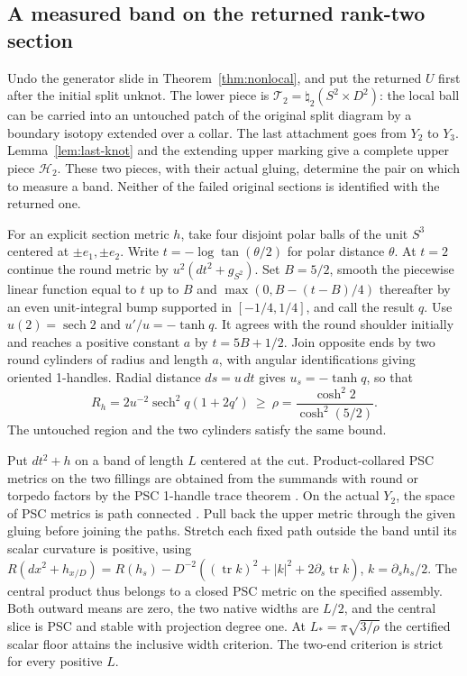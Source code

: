 \documentclass[11pt,letterpaper]{article}
\numberwithin{equation}{section}
\theoremstyle{remark}
\newcommand{\HB}[1]{\mathcal H_{#1}}
\newcommand{\TB}[1]{\mathcal T_{#1}}
\DeclareMathOperator{\tr}{tr}
\begin{document}
\subsection{A measured band on the returned rank-two section}

Undo the generator slide in Theorem~\ref{thm:nonlocal}, and put
the returned \(U\) first after the initial split unknot. The lower
piece is \(\TB2=\natural_2(S^2\times D^2)\): the local ball can
be carried into an untouched patch of the original split diagram
by a boundary isotopy extended over a collar. The last attachment
goes from \(Y_2\) to \(Y_3\). Lemma~\ref{lem:last-knot} and the
extending upper marking give a complete upper piece \(\HB2\).
These two pieces, with their actual gluing, determine the pair on
which to measure a band. Neither of the failed original sections is
identified with the returned one.

For an explicit section metric \(h\), take four disjoint polar
balls of the unit \(S^3\) centered at \(\pm e_1,\pm e_2\).
Write \(t=-\log\tan(\theta/2)\) for polar distance \(\theta\).
At \(t=2\) continue the round metric by
\(u^2(dt^2+g_{S^2})\). Set \(B=5/2\), smooth the piecewise
linear function equal to \(t\) up to \(B\) and
\(\max(0,B-(t-B)/4)\) thereafter by an even unit-integral bump
supported in \([-1/4,1/4]\), and call the result \(q\).
Use \(u(2)=\operatorname{sech}2\) and
\(u'/u=-\tanh q\). It agrees with the round shoulder initially
and reaches a positive constant \(a\) by \(t=5B+1/2\).
Join opposite ends by two round cylinders of radius and length
\(a\), with angular identifications giving oriented 1-handles.
Radial distance \(ds=u\,dt\) gives \(u_s=-\tanh q\), so that
\[
 R_h=2u^{-2}\operatorname{sech}^2q(1+2q')
       \ \ge\ \rho=\frac{\cosh^2 2}{\cosh^2(5/2)} .
\]
The untouched region and the two cylinders satisfy the same bound.

Put \(dt^2+h\) on a band of length \(L\) centered at the cut.
Product-collared PSC metrics on the two fillings are obtained
from the summands with round or torpedo factors by the PSC
1-handle trace theorem \cite[Theorem 1.2]{Walsh2008Metrics}.
On the actual \(Y_2\), the space of PSC metrics is path connected
\cite[Theorem 1.1]{BamlerKleiner2019Contractibility}. Pull back
the upper metric through the given gluing before joining the paths. Stretch each fixed path
outside the band until its scalar curvature is positive, using
\(R(dx^2+h_{x/D})=R(h_s)-D^{-2}
 ((\tr k)^2+|k|^2+2\partial_s\tr k)\),
\(k=\partial_sh_s/2\). The central product thus belongs to a
closed PSC metric on the specified assembly. Both outward means
are zero, the two native widths are \(L/2\), and the central slice
is PSC and stable with projection degree one. At
\(L_*=\pi\sqrt{3/\rho}\) the certified scalar floor attains the
inclusive width criterion. The two-end criterion is strict for
every positive \(L\).
\end{document}
